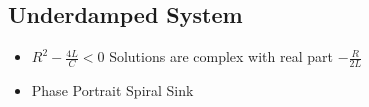 \documentclass[preview]{standalone}
\begin{document}
\begin{center}
\subsection*{Underdamped System}
                    \begin{itemize}
                        \item $R^2 - \frac{4L}{C} < 0$ \rightarrow Solutions are complex with real part $-\frac{R}{2L}$
                        \item Phase Portrait \rightarrow Spiral Sink
                    \end{itemize}
\end{center}
\end{document}
